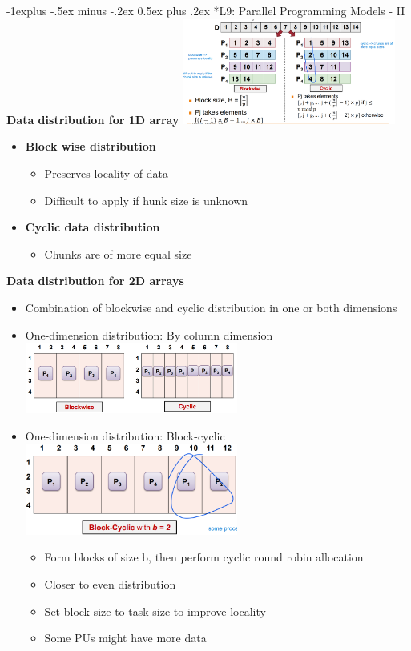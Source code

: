 \documentclass[10pt, landscape]{article}
\makeatletter
\renewcommand{\subsection}{\@startsection{subsection}{2}{0mm}%
                                {-1explus -.5ex minus -.2ex}%
                                {0.5ex plus .2ex}%
                                {\normalfont\normalsize\bfseries}}
\makeatother
\begin{document}
\begin{multicols}{4}
\subsection*{L9: Parallel Programming Models - II}
\textbf{Data distribution for 1D array} 
\includegraphics*[width=7cm]{1d_data_distribution.png}
\begin{itemize}
    \item \textbf{Block wise distribution}
    \begin{itemize}
        \item Preserves locality of data 
        \item Difficult to apply if hunk size is unknown
    \end{itemize}
    \item \textbf{Cyclic data distribution}
    \begin{itemize}
        \item Chunks are of more equal size 
    \end{itemize}
\end{itemize}

\textbf{Data distribution for 2D arrays}
\begin{itemize}
    \item Combination of blockwise and cyclic distribution in one or both dimensions
    \item One-dimension distribution: By column dimension
    \includegraphics*[width=7cm]{col.png}
    \item One-dimension distribution: Block-cyclic 
    \includegraphics*[width=7cm]{block_cyc.png}
    \begin{itemize}
        \item Form blocks of size b, then perform cyclic round robin allocation
        \item Closer to even distribution 
        \item Set block size to task size to improve locality
        \item Some PUs might have more data 
    \end{itemize}
\end{itemize}


\end{multicols}
\end{document}
